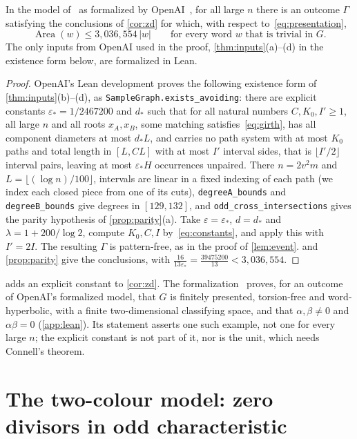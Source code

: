 \documentclass[11pt]{article}
\theoremstyle{definition}
\theoremstyle{plain}
\newcommand{\eps}{\varepsilon}
\newcommand{\Area}{\operatorname{Area}}
\newcommand{\lean}[1]{\texttt{\small #1}}
\begin{document}
\begin{corollary}\label{cor:lean}
In the model of~\cite{OAI196} as formalized by OpenAI~\cite{OAIlean}, for all large $n$ there is an outcome $\Gamma$ satisfying the conclusions of \cref{cor:zd} for which, with respect to~\eqref{eq:presentation},
\[
\Area(w)\le 3{,}036{,}554\,|w|\qquad\text{for every word $w$ that is trivial in $G$}.
\]
The only inputs from OpenAI used in the proof, \cref{thm:inputs}\textup{(a)--(d)} in the existence form below, are formalized in Lean.
\end{corollary}

\begin{proof}
OpenAI's Lean development proves the following existence form of \cref{thm:inputs}(b)--(d), as \lean{SampleGraph.exists\_avoiding}: there are explicit constants $\eps_*=1/2467200$ and $d_*$ such that for all natural numbers $C,K_0,I'\ge1$, all large $n$ and all roots $x_A,x_B$, some matching satisfies~\eqref{eq:girth}, has all component diameters at most $d_*L$, and carries no path system with at most $K_0$ paths and total length in $[L,CL]$ with at most $I'$ interval sides, that is $\lfloor I'/2\rfloor$ interval pairs, leaving at most $\eps_*H$ occurrences unpaired. There $n=2v^2m$ and $L=\lfloor(\log n)/100\rfloor$, intervals are linear in a fixed indexing of each path (we index each closed piece from one of its cuts), \lean{degreeA\_bounds} and \lean{degreeB\_bounds} give degrees in $[129,132]$, and \lean{odd\_cross\_intersections} gives the parity hypothesis of \cref{prop:parity}(a). Take $\eps=\eps_*$, $d=d_*$ and $\lambda=1+200/\log2$, compute $K_0,C,I$ by~\eqref{eq:constants}, and apply this with $I'=2I$. The resulting $\Gamma$ is pattern-free, as in the proof of \cref{lem:event}.  and \cref{prop:parity} give the conclusions, with $\frac{16}{13\eps_*}=\frac{39475200}{13}<3{,}036{,}554$.
\end{proof}

 adds an explicit constant to \cref{cor:zd}. The formalization~\cite{MghirbiLean} proves, for an outcome of OpenAI's formalized model, that $G$ is finitely presented, torsion-free and word-hyperbolic, with a finite two-dimensional classifying space, and that $\alpha,\beta\neq0$ and $\alpha\beta=0$ (\cref{app:lean}). Its statement asserts one such example, not one for every large $n$; the explicit constant is not part of it, nor is the unit, which needs Connell's theorem.

\section{The two-colour model: zero divisors in odd characteristic}\label{sec:zdodd}
\end{document}
